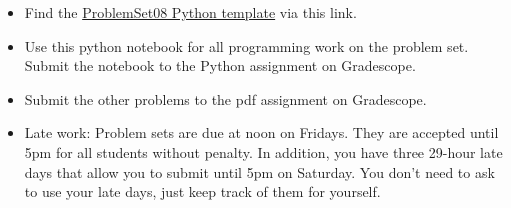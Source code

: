 \documentclass[12pt,letterpaper,noanswers]{exam}
\begin{document}
 \pdfpageheight 11in 
  \pdfpagewidth 8.5in

\begin{itemize}
    \itemsep0pt
    \item Find the \href{https://github.com/sarah1123/ScientificComputing-APMTH111/tree/main/2023Fall/PythonFiles/08_finitedifferences}{ProblemSet08 Python template} via this link.
    \item Use this python notebook for all programming work on the problem set.  Submit the notebook to the Python assignment on Gradescope.
    \item Submit the other problems to the pdf assignment on Gradescope.
    \item Late work: Problem sets are due at noon on Fridays.  They are accepted until 5pm for all students without penalty.  In addition, you have three 29-hour late days that allow you to submit until 5pm on Saturday.  You don't need to ask to use your late days, just keep track of them for yourself.
\end{itemize}
\end{document}
